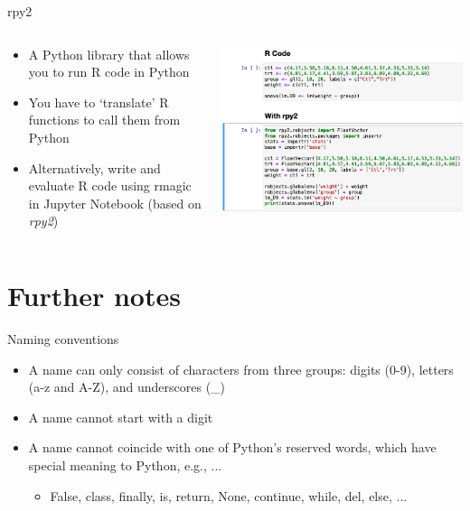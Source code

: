 \documentclass[10pt, aspectratio=169]{beamer}
\newcommand{\gemph}[1]{\textcolor{mzesgold}{#1}}
\begin{document}
{	\begin{frame}{rpy2}
  \begin{columns}
\begin{column}{0.5\textwidth}
    \begin{itemize}
        \item A Python library that allows you to run R code in Python
        \item You have to ‘translate’ R functions to call them from Python
        \item Alternatively, write and evaluate R code using \gemph{rmagic} in Jupyter Notebook (based on \textit{rpy2})
    \end{itemize}
\end{column}
\begin{column}{0.5\textwidth}  %
    \begin{center}
      \includegraphics[scale=.28]{Day 1/Slides/LaTeX files/rpy2.png} 
     \end{center}
\end{column}
\end{columns}
  \end{frame}

\section{Further notes}
\begin{frame}{Naming conventions}
    \begin{itemize}
        \item A name can only consist of characters from three groups: digits (0-9), letters (a-z and A-Z), and underscores (\_)
        \item A name cannot start with a digit
        \item A name cannot coincide with one of Python’s reserved words, which have special meaning to Python, e.g., ...
        \begin{itemize}
            \item False, class, finally, is, return, None, continue, while, del, else, ...
        \end{itemize}
    \end{itemize}
\end{frame}

}
\end{document}
